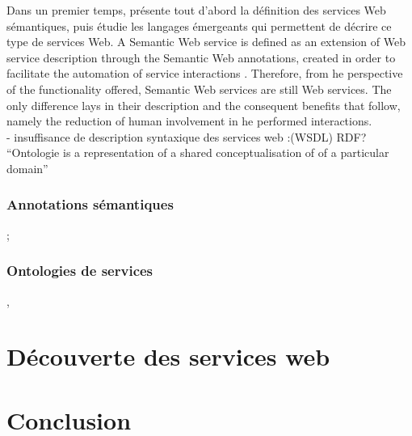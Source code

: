 	    Dans un premier temps, présente tout d'abord la définition des services Web sémantiques, puis étudie les
	    langages émergeants qui permettent de décrire ce type de services Web.
	    A Semantic Web service is defined as an extension of Web service description through the Semantic Web annotations,
	    created in order to facilitate the automation of service interactions . Therefore, from 
	    he perspective of the functionality offered, Semantic Web services are still Web services. The only difference lays
	    in their description and the consequent benefits that follow, namely the reduction of human involvement in 
	    he performed interactions.\\

	    - insuffisance de description syntaxique des services web :(WSDL)
	     RDF? \cite{lassila1999resource}\\
	    ``Ontologie is a representation of a shared conceptualisation of of a particular domain'' 

	\subsubsection{Annotations sémantiques};
	\subsubsection{Ontologies de services} 
	  \cite{mcguinness2004owl} , \cite{mcilraith2003bringing}

\section{Découverte des services web}

\section{Conclusion}
